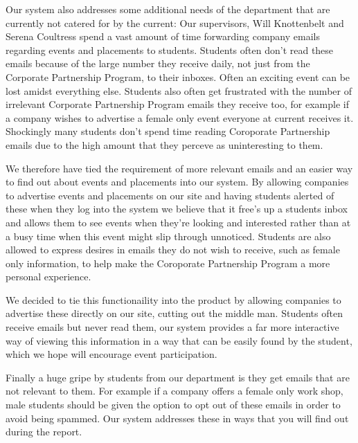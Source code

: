 Our system also addresses some additional needs of the department that are currently not catered for by the current:
Our supervisors, Will Knottenbelt and Serena Coultress spend a vast amount of time forwarding company emails regarding events and placements to students.
Students often don't read these emails because of the large number they receive daily, not just from the Corporate Partnership Program, to their inboxes. Often an exciting event can be lost amidst everything else. Students also often get frustrated with the number of irrelevant Corporate Partnership Program emails they receive too, for example if a company wishes to advertise a female only event everyone at current receives it.
Shockingly many students don't spend time reading Coroporate Partnership emails due to the high amount that they perceve as uninteresting to them.

We therefore have tied the requirement of more relevant emails and an easier way to find out about events and placements into our system. By allowing companies to advertise events and placements on our site and having students alerted of these when they log into the system we believe that it free's
up a students inbox and allows them to see events when they're looking and interested rather than at a busy time when this event might slip through
unnoticed.
Students are also allowed to express desires in emails they do not wish to receive, such as female only information, to help make the Coroporate Partnership Program a more personal experience. 


We decided to tie this functionaility into the product by allowing companies to advertise these directly on our site, cutting out the middle man.
Students often receive emails but never read them, our system provides a far more interactive way of viewing this information in a way that can be easily found by the student, which we hope will encourage event participation.

Finally a huge gripe by students from our department is they get emails that are not relevant to them. For example if a company offers a female only work shop, male students should be given the option to opt out of these emails in order to avoid being spammed. Our system addresses these in ways that you will find out during the report.
